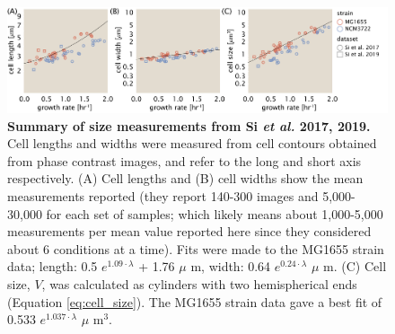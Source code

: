 \begin{figure}
		\centering
    \includegraphics[width=1.0\textwidth]{SI_figs/final_cell_size_Si.pdf}
    \caption{\textbf{Summary of size measurements from Si \textit{et al.} 2017,
    2019.} Cell lengths and widths were measured from cell contours obtained from
    phase contrast images, and refer to the long and short axis respectively. (A)
    Cell lengths and (B) cell widths show the mean measurements reported (they
    report 140-300 images and 5,000-30,000 for each set of samples; which likely
    means about 1,000-5,000 measurements per mean value reported here since they
    considered about 6 conditions at a time). Fits were made to the  MG1655 strain
    data; length: 0.5 $e^{1.09 \cdot \lambda}$ + 1.76 $\mu$ m, width:  0.64
    $e^{0.24 \cdot \lambda}$ $\mu$ m. (C) Cell size, $V$, was calculated as
    cylinders with two hemispherical ends (Equation \ref{eq:cell_size}). The
    MG1655 strain data gave a best fit of 0.533 $e^{1.037 \cdot \lambda}$ $\mu$
    m$^3$.}
  \label{fig:final_size_data_Si}
\end{figure}
